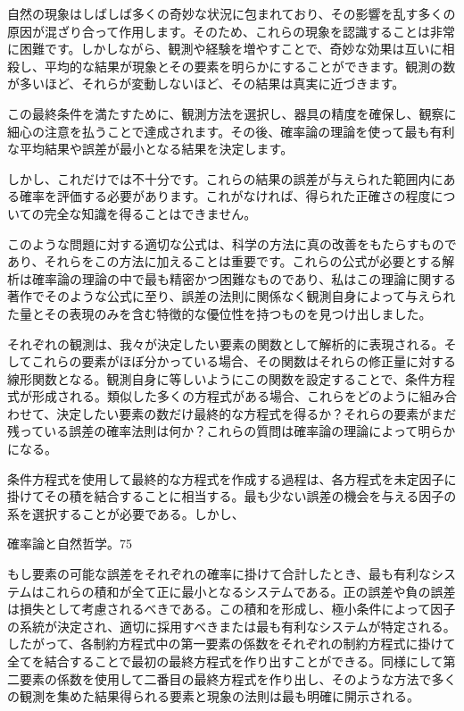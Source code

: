 \documentclass[a4paper,11pt,openany]{ltjsbook}
\begin{document}
自然の現象はしばしば多くの奇妙な状況に包まれており、その影響を乱す多くの原因が混ざり合って作用します。そのため、これらの現象を認識することは非常に困難です。しかしながら、観測や経験を増やすことで、奇妙な効果は互いに相殺し、平均的な結果が現象とその要素を明らかにすることができます。観測の数が多いほど、それらが変動しないほど、その結果は真実に近づきます。

この最終条件を満たすために、観測方法を選択し、器具の精度を確保し、観察に細心の注意を払うことで達成されます。その後、確率論の理論を使って最も有利な平均結果や誤差が最小となる結果を決定します。

しかし、これだけでは不十分です。これらの結果の誤差が与えられた範囲内にある確率を評価する必要があります。これがなければ、得られた正確さの程度についての完全な知識を得ることはできません。

このような問題に対する適切な公式は、科学の方法に真の改善をもたらすものであり、それらをこの方法に加えることは重要です。これらの公式が必要とする解析は確率論の理論の中で最も精密かつ困難なものであり、私はこの理論に関する著作でそのような公式に至り、誤差の法則に関係なく観測自身によって与えられた量とその表現のみを含む特徴的な優位性を持つものを見つけ出しました。

それぞれの観測は、我々が決定したい要素の関数として解析的に表現される。そしてこれらの要素がほぼ分かっている場合、その関数はそれらの修正量に対する線形関数となる。観測自身に等しいようにこの関数を設定することで、条件方程式が形成される。類似した多くの方程式がある場合、これらをどのように組み合わせて、決定したい要素の数だけ最終的な方程式を得るか？それらの要素がまだ残っている誤差の確率法則は何か？これらの質問は確率論の理論によって明らかになる。

条件方程式を使用して最終的な方程式を作成する過程は、各方程式を未定因子に掛けてその積を結合することに相当する。最も少ない誤差の機会を与える因子の系を選択することが必要である。しかし、

確率論と自然哲学。75

もし要素の可能な誤差をそれぞれの確率に掛けて合計したとき、最も有利なシステムはこれらの積和が全て正に最小となるシステムである。正の誤差や負の誤差は損失として考慮されるべきである。この積和を形成し、極小条件によって因子の系統が決定され、適切に採用すべきまたは最も有利なシステムが特定される。したがって、各制約方程式中の第一要素の係数をそれぞれの制約方程式に掛けて全てを結合することで最初の最終方程式を作り出すことができる。同様にして第二要素の係数を使用して二番目の最終方程式を作り出し、そのような方法で多くの観測を集めた結果得られる要素と現象の法則は最も明確に開示される。
\end{document}
